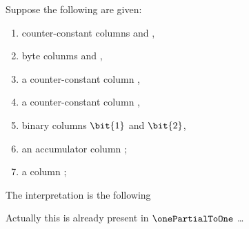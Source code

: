 Suppose the following are given:
\begin{enumerate}
	\item counter-constant columns \source{} and \target{},
	\item byte colunms \source\byte{} and \target\byte{},
	\item a counter-constant column \source\mark{},
	\item a counter-constant column \size{},
	\item binary columns $\bit{1}$ and $\bit{2}$,
	\item an accumulator column \ACC{};
	\item a column ;
\end{enumerate}
The interpretation is the following

Actually this is already present in $\onePartialToOne$ \dots{}

